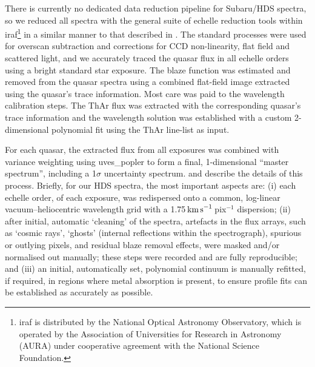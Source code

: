 \documentclass[fleqn,usenatbib,usedcolumn]{mnras}
\newcommand{\kms}{\ensuremath{\textrm{km\,s}^{-1}}}
\begin{document}
There is currently no dedicated data reduction pipeline for Subaru/HDS spectra, so we reduced all spectra with the general suite of echelle reduction tools within {\sc iraf}\footnote{{\sc iraf} is distributed by the National Optical Astronomy Observatory, which is operated by the Association of Universities for Research in Astronomy (AURA) under cooperative agreement with the National Science Foundation.} in a similar manner to that described in \citet{Evans:2014:128}. The standard processes were used for overscan subtraction and corrections for CCD non-linearity, flat field and scattered light, and we accurately traced the quasar flux in all echelle orders using a bright standard star exposure. The blaze function was estimated and removed from the quasar spectra using a combined flat-field image extracted using the quasar's trace information. Most care was paid to the wavelength calibration steps. The ThAr flux was extracted with the corresponding quasar's trace information and the wavelength solution was established with a custom 2-dimensional polynomial fit using the \citet{Murphy:2007:221} ThAr line-list as input.

For each quasar, the extracted flux from all exposures was combined with variance weighting using {\sc uves\_popler} \citep[][version 0.73]{Murphy:2016:UVESpopler} to form a final, 1-dimensional ``master spectrum'', including a 1$\sigma$ uncertainty spectrum. \citet{Evans:2014:128} and \citet{Murphy:2016:2461} describe the details of this process. Briefly, for our HDS spectra, the most important aspects are: (i) each echelle order, of each exposure, was redispersed onto a common, log-linear vacuum--heliocentric wavelength grid with a 1.75\,\kms\,pix$^{-1}$ dispersion; (ii) after initial, automatic `cleaning' of the spectra, artefacts in the flux arrays, such as `cosmic rays', `ghosts' (internal reflections within the spectrograph), spurious or outlying pixels, and residual blaze removal effects, were masked and/or normalised out manually; these steps were recorded and are fully reproducible; and (iii) an initial, automatically set, polynomial continuum is manually refitted, if required, in regions where metal absorption is present, to ensure profile fits can be established as accurately as possible.
\end{document}
